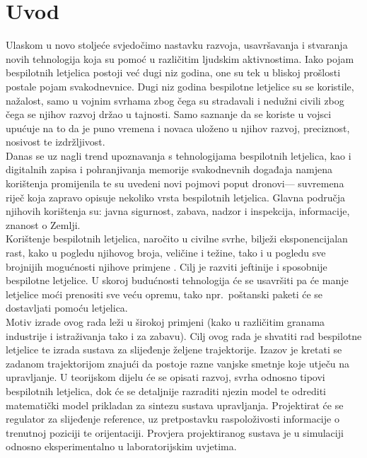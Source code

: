 \documentclass[times, utf8, diplomski]{fer}
\begin{document}
\chapter{Uvod}
Ulaskom u novo stoljeće svjedočimo nastavku razvoja, usavršavanja i stvaranja novih tehnologija koja su pomoć u različitim ljudskim aktivnostima. Iako pojam bespilotnih letjelica postoji već dugi niz godina, one su tek u bliskoj prošlosti postale pojam svakodnevnice. Dugi niz godina bespilotne letjelice su se koristile, nažalost, samo u vojnim svrhama zbog čega su stradavali i nedužni civili zbog čega se njihov razvoj držao u tajnosti. Samo saznanje da se koriste u vojsci upućuje na to da je puno vremena i novaca uloženo u njihov razvoj, preciznost, nosivost te izdržljivost.\\
Danas se uz nagli trend upoznavanja s tehnologijama bespilotnih letjelica, kao i digitalnih zapisa i pohranjivanja memorije svakodnevnih događaja namjena korištenja promijenila te su uvedeni novi pojmovi poput \glqq dronovi\grqq --- suvremena riječ koja zapravo opisuje nekoliko vrsta bespilotnih letjelica. Glavna područja njihovih korištenja su: javna sigurnost, zabava, nadzor i inspekcija, informacije, znanost o Zemlji.\\
Korištenje  bespilotnih letjelica, naročito u civilne svrhe, bilježi eksponencijalan rast, kako u pogledu njihovog broja, veličine i težine, tako i u pogledu sve brojnijih mogućnosti njihove primjene \citep{EUR-Lex}. Cilj je razviti jeftinije i sposobnije bespilotne letjelice. U skoroj budućnosti tehnologija će se usavršiti pa će manje letjelice moći prenositi sve veću opremu, tako npr.~poštanski paketi će se dostavljati pomoću letjelica.\\
Motiv izrade ovog rada leži u širokoj primjeni (kako u različitim granama industrije i istraživanja tako i za zabavu). Cilj ovog rada je shvatiti rad bespilotne letjelice te izrada sustava za slijeđenje željene trajektorije. Izazov je kretati se zadanom trajektorijom znajući da postoje razne vanjske smetnje koje utječu na upravljanje. U teorijskom dijelu će se opisati razvoj, svrha odnosno tipovi bespilotnih letjelica, dok će se detaljnije razraditi njezin model te odrediti matematički model prikladan za sintezu sustava upravljanja. Projektirat će se regulator za slijeđenje reference, uz pretpostavku raspoloživosti informacije o trenutnoj poziciji te orijentaciji. Provjera projektiranog sustava je u simulaciji odnosno eksperimentalno u laboratorijskim uvjetima.
\end{document}
